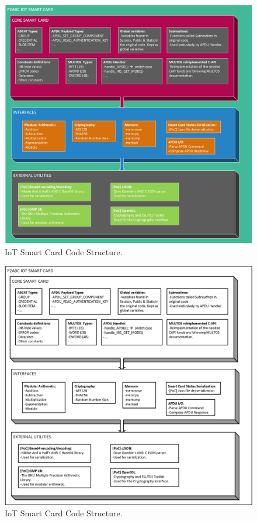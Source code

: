 \begin{figure}[bth]
	\begin{center}
		\includegraphics[width=\linewidth]{gfx/IoTCScomponents-color}
	\end{center}
	\caption{IoT Smart Card Code Structure.}
	\label{fig:IoTCScomponents-color}
\end{figure}

\begin{figure}[bth]
	\begin{center}
		\includegraphics[width=\linewidth]{gfx/IoTCScomponents-bw}
	\end{center}
	\caption{IoT Smart Card Code Structure.}
	\label{fig:IoTCScomponents-bw}
\end{figure}



